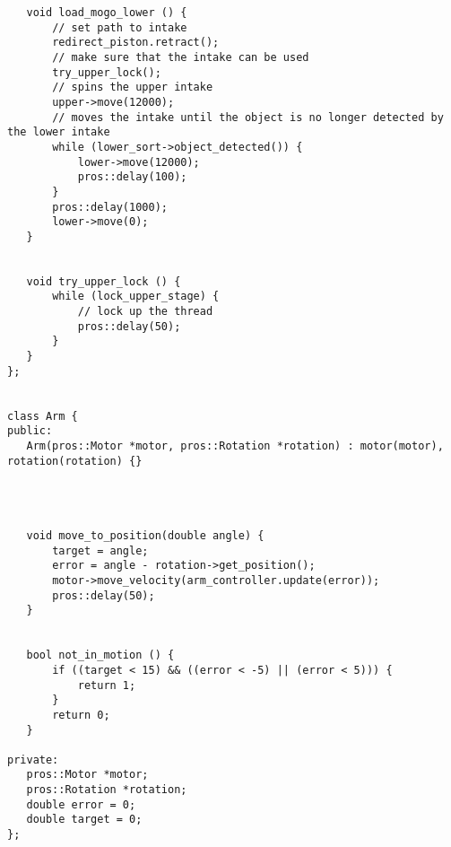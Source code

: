 \begin{verbatim}
   void load_mogo_lower () {
       // set path to intake
       redirect_piston.retract();
       // make sure that the intake can be used
       try_upper_lock();
       // spins the upper intake
       upper->move(12000);
       // moves the intake until the object is no longer detected by the lower intake
       while (lower_sort->object_detected()) {
           lower->move(12000);
           pros::delay(100);
       }
       pros::delay(1000);
       lower->move(0);
   }


   void try_upper_lock () {
       while (lock_upper_stage) {
           // lock up the thread
           pros::delay(50);
       }
   }
};


class Arm {
public:
   Arm(pros::Motor *motor, pros::Rotation *rotation) : motor(motor), rotation(rotation) {}




   void move_to_position(double angle) {
       target = angle;
       error = angle - rotation->get_position();
       motor->move_velocity(arm_controller.update(error));
       pros::delay(50);
   }


   bool not_in_motion () {
       if ((target < 15) && ((error < -5) || (error < 5))) {
           return 1;
       }
       return 0;
   }
  
private:
   pros::Motor *motor;
   pros::Rotation *rotation;
   double error = 0;
   double target = 0;
};

\end{verbatim}

